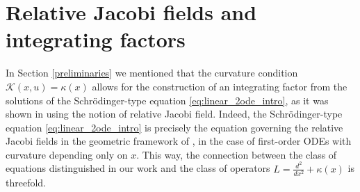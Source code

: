 \documentclass[preprint,a4paper]{elsarticle}
\begin{document}
 






\section{Relative Jacobi fields and integrating factors}\label{sec:jacobi}

In Section \ref{preliminaries} we mentioned that the curvature condition $\mathcal{K}(x,u) = \kappa(x)$ allows for the construction of an integrating factor from the solutions of the Schrödinger-type equation \eqref{eq:linear_2ode_intro}, as it was shown in \cite{surfaces2025,integrationJacobifields} using the notion of relative Jacobi field. Indeed, the Schrödinger-type equation \eqref{eq:linear_2ode_intro} is precisely the equation governing the relative Jacobi fields in the geometric framework of \cite{surfaces2025,integrationJacobifields}, in the case of first-order ODEs with curvature depending only on $x$. This way, the connection between the class of equations distinguished in our work and the class of operators $L=\frac{d^2}{dx^2}+\kappa(x)$ is threefold.
\end{document}
